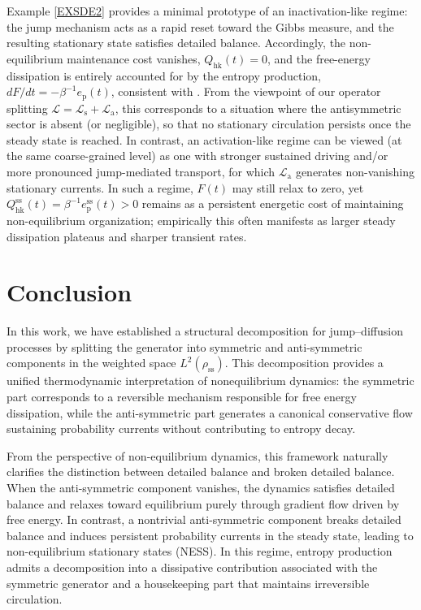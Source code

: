 \documentclass[10pt]{article}
\theoremstyle{definition}
\numberwithin{equation}{section}
\begin{document}
Example \eqref{EXSDE2} provides a minimal prototype of an inactivation-like regime: the jump mechanism acts as a rapid reset toward the Gibbs measure, and the resulting stationary state satisfies detailed balance. Accordingly, the non-equilibrium maintenance cost vanishes, $Q_\mathrm{hk}(t)=0$, and the free-energy dissipation is entirely accounted for by the entropy production, $dF/dt=-\beta^{-1}e_\mathrm{p}(t)$, consistent with . From the viewpoint of our operator splitting $\mathcal{L}=\mathcal{L}_\mathrm{s}+\mathcal{L}_\mathrm{a}$, this corresponds to a situation where the antisymmetric sector is absent (or negligible), so that no stationary circulation persists once the steady state is reached. In contrast, an activation-like regime can be viewed (at the same coarse-grained level) as one with stronger sustained driving and/or more pronounced jump-mediated transport, for which $\mathcal{L}_\mathrm{a}$ generates non-vanishing stationary currents. In such a regime, $F(t)$ may still relax to zero, yet $Q^\mathrm{ss}_\mathrm{hk}(t) = \beta^{-1}e^\mathrm{ss}_\mathrm{p}(t) > 0$ remains as a persistent energetic cost of maintaining non-equilibrium organization; empirically this often manifests as larger steady dissipation plateaus and sharper transient rates.

\section{Conclusion}

In this work, we have established a structural decomposition for jump--diffusion processes by splitting the generator into symmetric and anti-symmetric components in the weighted space $L^2(\rho_\mathrm{ss})$. 
This decomposition provides a unified thermodynamic interpretation of nonequilibrium dynamics: the symmetric part corresponds to a reversible mechanism responsible for free energy dissipation, while the anti-symmetric part generates a canonical conservative flow sustaining probability currents without contributing to entropy decay.

From the perspective of non-equilibrium dynamics, this framework naturally clarifies the distinction between detailed balance and broken detailed balance. 
When the anti-symmetric component vanishes, the dynamics satisfies detailed balance and relaxes toward equilibrium purely through gradient flow driven by free energy. 
In contrast, a nontrivial anti-symmetric component breaks detailed balance and induces persistent probability currents in the steady state, leading to non-equilibrium stationary states (NESS). 
In this regime, entropy production admits a decomposition into a dissipative contribution associated with the symmetric generator and a housekeeping part that maintains irreversible circulation.
\end{document}
